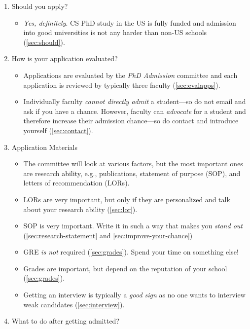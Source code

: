 \documentclass[oneside,11pt]{memoir}
\begin{document}
\begin{enumerate}
  \item Should you apply?
        \begin{itemize}
          \item \emph{Yes, definitely}.  CS PhD study in the US is fully funded and admission into good universities is not any harder than non-US schools (\autoref{sec:should}).
        \end{itemize}
  \item How is your application evaluated?
        \begin{itemize}
          \item Applications are evaluated by the \emph{PhD Admission} committee and each application is reviewed by typically three faculty (\autoref{sec:evalapps}).
          \item Individually faculty \emph{cannot directly admit} a student---so do not email and ask if you have a chance. However, faculty can \emph{advocate} for a student and therefore increase their admission chance---so do contact and introduce yourself (\autoref{sec:contact}).
         \end{itemize}
  \item Application Materials
        \begin{itemize}
          \item The committee will look at various factors, but the most important ones are research ability, e.g., publications, statement of purpose (SOP), and  letters of recommendation (LORs).
          \item LORs are very important, but only if they are personalized and talk about your research ability (\autoref{sec:lor}).
          \item SOP is very important. Write it in such a way that makes you \emph{stand out} (\autoref{sec:research-statement} and \autoref{sec:improve-your-chance})
          \item GRE \emph{is not} required (\autoref{sec:grades}). Spend your time on something else!
          \item Grades are important, but depend on the reputation of your school (\autoref{sec:grades}).
          \item Getting an interview is typically a \emph{good sign} as no one wants to interview weak candidates (\autoref{sec:interview}).
        \end{itemize}
  \item What to do after getting admitted?
        \begin{itemize}

\end{itemize}
\end{enumerate}
\end{document}
